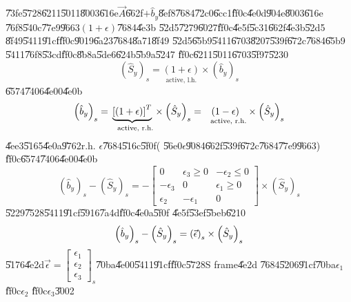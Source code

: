 \documentclass[12pt,a4paper]{article}
\begin{document}
\U{73fe}\U{5728}\U{6211}\U{5011}\U{8003}\U{616e}$\vec{A}$\U{662f}$+\hat{b}%
_{y}$\U{8ef8}\U{7684}\U{72c0}\U{6cc1}\U{ff0c}\U{4e0d}\U{904e}\U{8003}\U{616e}%
\U{76f8}\U{540c}\U{77e9}\U{9663}$\left( 1+\epsilon \right) $\U{7684}\U{4e3b}%
\U{52d5}\U{7279}\U{6027}\U{ff0c}\U{4e5f}\U{5c31}\U{662f}\U{4e3b}\U{52d5}%
\U{8f49}\U{5411}\U{91cf}\U{ff0c}\U{9019}\U{6a23}\U{7684}\U{8a71}\U{8f49}%
\U{52d5}\U{65b9}\U{5411}\U{6703}\U{8207}\U{539f}\U{672c}\U{7684}\U{65b9}%
\U{5411}\U{76f8}\U{53cd}\U{ff0c}\U{8b8a}\U{5de6}\U{624b}\U{5b9a}\U{5247}%
\U{ff0c}\U{6211}\U{5011}\U{6703}\U{5f97}\U{5230}%
\begin{equation*}
\left( \hat{S}_{y}\right) _{s}=\underset{\text{active, l.h.}}{\left(
1+\epsilon \right) }\times \left( \hat{b}_{y}\right) _{s}
\end{equation*}%
\U{6574}\U{7406}\U{4e00}\U{4e0b}%
\begin{equation*}
\left( \hat{b}_{y}\right) _{s}=\underset{\text{active, r.h.}}{\underbrace{%
\left[ \left( 1+\epsilon \right) \right] ^{T}}}\times \left( \hat{S}%
_{y}\right) _{s}=\underset{\text{active, r.h.}}{\left( 1-\epsilon \right) }%
\times \left( \hat{S}_{y}\right) _{s}
\end{equation*}%
\U{4ee3}\U{5165}\U{4e0a}\U{9762}r.h. $\epsilon $\U{7684}\U{516c}\U{5f0f}(%
\U{56e0}$\epsilon $\U{9084}\U{662f}\U{539f}\U{672c}\U{7684}\U{77e9}\U{9663})%
\U{ff0c}\U{6574}\U{7406}\U{4e00}\U{4e0b}%
\begin{equation*}
\left( \hat{b}_{y}\right) _{s}-\left( \hat{S}_{y}\right) _{s}=-\left[ 
\begin{array}{ccc}
0 & \epsilon _{3}\geq 0 & -\epsilon _{2}\leq 0 \\ 
-\epsilon _{3} & 0 & \epsilon _{1}\geq 0 \\ 
\epsilon _{2} & -\epsilon _{1} & 0%
\end{array}%
\right] \times \left( \hat{S}_{y}\right) _{s}
\end{equation*}%
\U{5229}\U{7528}\U{5411}\U{91cf}\U{5916}\U{7a4d}\U{ff0c}\U{4e0a}\U{5f0f}%
\U{4e5f}\U{53ef}\U{5beb}\U{6210}%
\begin{equation*}
\left( \hat{b}_{y}\right) _{s}-\left( \hat{S}_{y}\right) _{s}=\left( \vec{%
\epsilon}\right) _{s}\times \left( \hat{S}_{y}\right) _{s}
\end{equation*}%
\U{5176}\U{4e2d}$\vec{\epsilon}=\left[ 
\begin{array}{c}
\epsilon _{1} \\ 
\epsilon _{2} \\ 
\epsilon _{3}%
\end{array}%
\right] _{s}$\U{70ba}\U{4e00}\U{5411}\U{91cf}\U{ff0c}\U{5728}S frame\U{4e2d}%
\U{7684}\U{5206}\U{91cf}\U{70ba}$\epsilon _{1}$\U{ff0c}$\epsilon _{2}$%
\U{ff0c}$\epsilon _{3}$\U{3002}
\end{document}
